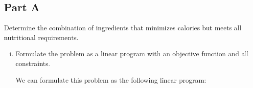 \documentclass[../main.tex]{subfiles}
\begin{document}
\subsection*{Part A}
Determine the combination of ingredients that minimizes calories but meets all nutritional requirements.

\begin{enumerate}[i.]
	\item Formulate the problem as a linear program with an objective function and all constraints.

	We can formulate this problem as the following linear program:


\end{enumerate}
\end{document}
